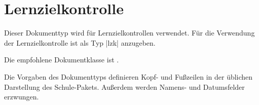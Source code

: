 \section{Lernzielkontrolle}
\label{typ:lzk}
Dieser Dokumenttyp wird für Lernzielkontrollen verwendet. Für die Verwendung der Lernzielkontrolle ist als Typ \verbcode|lzk| anzugeben.

Die empfohlene Dokumentklasse ist .

Die Vorgaben des Dokumenttyps definieren Kopf- und Fußzeilen in der üblichen Darstellung des Schule-Pakets. Außerdem werden Namens- und Datumsfelder erzwungen.


%
%
